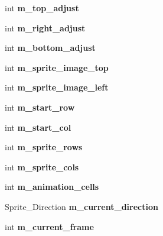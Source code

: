 \begin{DoxyCompactItemize}
\mbox{\label{class_sprite_ac12b46153b557acad91b0763377a8747}} 
int {\bfseries m\+\_\+top\+\_\+adjust}
\item 
\mbox{\label{class_sprite_aa53eecf1c0313b0530aa8e87364e5483}} 
int {\bfseries m\+\_\+right\+\_\+adjust}
\item 
\mbox{\label{class_sprite_a5e9335a279146b9d6a39732286f66442}} 
int {\bfseries m\+\_\+bottom\+\_\+adjust}
\item 
\mbox{\label{class_sprite_a0cbe2eea79406aa5eab79f3271f5c901}} 
int {\bfseries m\+\_\+sprite\+\_\+image\+\_\+top}
\item 
\mbox{\label{class_sprite_a1bb7b306f6c0387a8f5650a4e45daddd}} 
int {\bfseries m\+\_\+sprite\+\_\+image\+\_\+left}
\item 
\mbox{\label{class_sprite_a4a6bdd8069db054217442c6b8aead52a}} 
int {\bfseries m\+\_\+start\+\_\+row}
\item 
\mbox{\label{class_sprite_a2314213e4197f42f810e48f1243f8596}} 
int {\bfseries m\+\_\+start\+\_\+col}
\item 
\mbox{\label{class_sprite_ad644cf3253e4b3371e225726f8e9dacc}} 
int {\bfseries m\+\_\+sprite\+\_\+rows}
\item 
\mbox{\label{class_sprite_a80844771769275623be3247941459e11}} 
int {\bfseries m\+\_\+sprite\+\_\+cols}
\item 
\mbox{\label{class_sprite_ac88ed94b6860902cecb17951ce9875ff}} 
int {\bfseries m\+\_\+animation\+\_\+cells}
\item 
\mbox{\label{class_sprite_a2e9f094a7a7e6437e9577fb588060bab}} 
Sprite\+\_\+\+Direction {\bfseries m\+\_\+current\+\_\+direction}
\item 
\mbox{\label{class_sprite_ac73ca0065a580f0ea4e9a326b978b4b1}} 
int {\bfseries m\+\_\+current\+\_\+frame}
\item 
\mbox{\label{class_sprite_a021bef47963b5be8b19ba755015d8ac1}} 

\end{DoxyCompactItemize}
